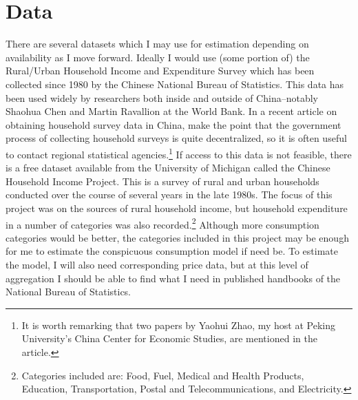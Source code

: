 \documentclass[a4paper,10pt]{article}
\begin{document}
\section{Data}
There are several datasets which I may use for estimation depending on availability as I move forward.  Ideally I would use (some portion of) the Rural/Urban Household Income and Expenditure Survey which has been collected since 1980 by the Chinese National Bureau of Statistics.  This data has been used widely by researchers both inside and outside of China--notably Shaohua Chen and Martin Ravallion at the World Bank.  In a recent article on obtaining household survey data in China, \citet{GustafssonShi2006} make the point that the government process of collecting household surveys is quite decentralized, so it is often useful to contact regional statistical agencies.\footnote{It is worth remarking that two papers by Yaohui Zhao, my host at Peking University's China Center for Economic Studies, are mentioned in the article.}  If access to this data is not feasible, there is a free dataset available from the University of Michigan called the Chinese Household Income Project.  This is a survey of rural and urban households conducted over the course of several years in the late 1980s.  The focus of this project was on the sources of rural household income, but household expenditure in a number of categories was also recorded.\footnote{Categories included are: Food, Fuel, Medical and Health Products, Education, Transportation, Postal and Telecommunications, and Electricity.}  Although more consumption categories would be better, the categories included in this project may be enough for me to estimate the conspicuous consumption model if need be.  To estimate the model, I will also need corresponding price data, but at this level of aggregation I should be able to find what I need in published handbooks of the National Bureau of Statistics.    
\end{document}
